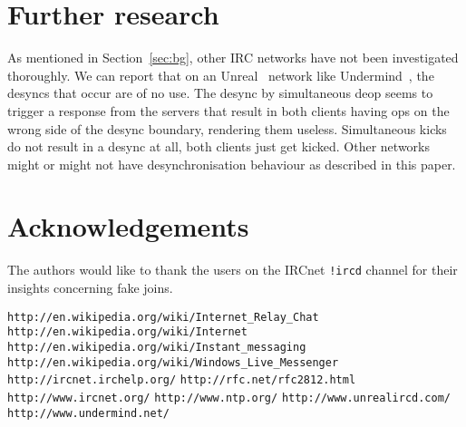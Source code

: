 \documentclass{article}
\theoremstyle{definition}
\begin{document}
\section{Further research} \label{sec:further}
As mentioned in Section~\ref{sec:bg}, other IRC networks have not been
investigated thoroughly. We can report that on an Unreal~\cite{UNR} network
like Undermind~\cite{UND}, the desyncs that occur are of no use. The desync by
simultaneous deop seems to trigger a response from the servers that result in
both clients having ops on the wrong side of the desync boundary, rendering
them useless. Simultaneous kicks do not result in a desync at all, both clients
just get kicked. Other networks might or might not have desynchronisation
behaviour as described in this paper.

\section{Acknowledgements} \label{sec:ack}
The authors would like to thank the users on the IRCnet \verb#!ircd# channel
for their insights concerning fake joins.

\begin{thebibliography}{XX}
 \verb#http://en.wikipedia.org/wiki/Internet_Relay_Chat#
 \verb#http://en.wikipedia.org/wiki/Internet#
 \verb#http://en.wikipedia.org/wiki/Instant_messaging#
 \verb#http://en.wikipedia.org/wiki/Windows_Live_Messenger#
 \verb#http://ircnet.irchelp.org/#
 \verb#http://rfc.net/rfc2812.html#
 \verb#http://www.ircnet.org/#
 \verb#http://www.ntp.org/#
 \verb#http://www.unrealircd.com/#
 \verb#http://www.undermind.net/#
\end{thebibliography}
\end{document}
